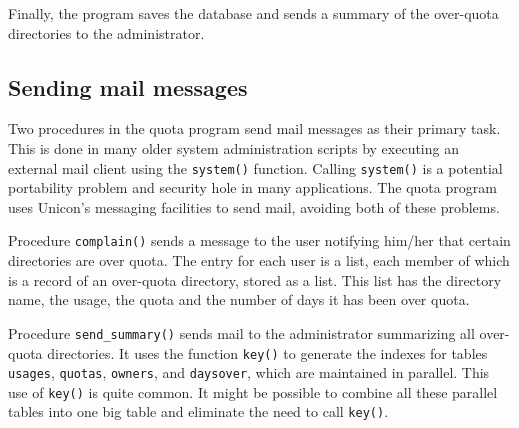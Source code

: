 Finally, the program saves the database and sends a summary of the
over-quota directories to the administrator. 


\subsection*{Sending mail messages}

Two procedures in the quota program send mail messages as their primary
task. This is done in many older system administration scripts by
executing an external mail client using the \texttt{system()} function.
Calling \texttt{system()} is a potential portability
problem and security hole in many applications. The quota program uses
Unicon's messaging facilities to send mail, avoiding
both of these problems.

Procedure \texttt{complain()} sends a message to the user notifying
him/her that certain directories are over quota. The entry for each
user is a list, each member of which is a record of an over-quota
directory, stored as a list. This list has the directory name, the
usage, the quota and the number of days it has been over quota.


Procedure \texttt{send\_summary()} sends mail to the administrator
summarizing all over-quota directories. It uses the function
\texttt{key()} to generate the indexes for tables
\texttt{usages}, \texttt{quotas}, \texttt{owners}, and
\texttt{daysover}, which are maintained in parallel. This use of
\texttt{key()} is quite common. It might be possible to combine all
these parallel tables into one big table and eliminate the need to call
\texttt{key()}.

